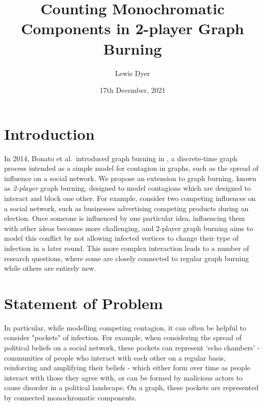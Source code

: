 \documentclass{mprop}
\begin{document}
\title{Counting Monochromatic Components in 2-player Graph Burning}
\author{Lewis Dyer}
\date{17th December, 2021}
\maketitle

\tableofcontents
\newpage

\section{Introduction}\label{intro}


In 2014, Bonato et al.\ introduced graph burning in \cite{bonato_burning_2014}, a discrete-time graph process intended as a simple model for contagion in graphs, such as the spread of influence on a social network. We propose an extension to graph burning, known as \emph{2-player} graph 
burning, designed to model contagions which are designed to interact and block one other. For example, consider two competing influences on a social network, such as businesses advertising competing products during an election. Once someone is influenced by one particular idea, influencing them with other ideas becomes more challenging, and 2-player graph burning aims to model this conflict by not allowing infected vertices to change their type of infection in a later round. This more complex interaction leads to a number of research questions, where some are closely connected to regular graph burning while others are entirely new.

\section{Statement of Problem}

In particular, while modelling competing contagion, it can often be helpful to consider "pockets" of infection. For example, when considering the spread of political beliefs on a social network, these pockets can represent `echo chambers' - communities of people who interact with each other on a regular basis, reinforcing and amplifying their beliefs - which either form over time as people interact with those they agree with, or can be formed by malicious actors to cause disorder in a political landscape. On a graph, these pockets are represented by connected monochromatic components.
\end{document}
